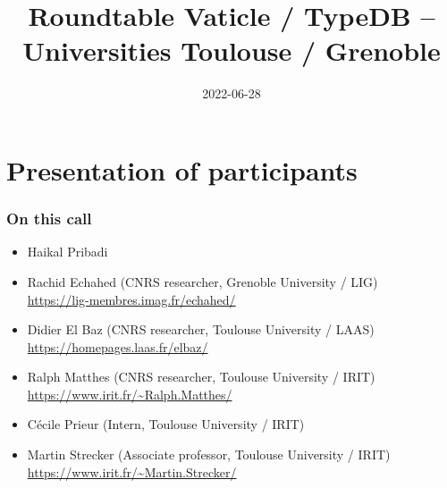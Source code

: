 \documentclass{beamer}
\title[Roundtable Vaticle / TypeDB  -- Toulouse / Grenoble]{Roundtable Vaticle / TypeDB -- Universities Toulouse / Grenoble}
\author{}
\date{2022-06-28}
\begin{document}

\begin{frame}
  \titlepage
\end{frame}



\section{Presentation of participants}

\begin{frame}[fragile]\frametitle{On this call}


  \begin{itemize}
  \item Haikal Pribadi
  \end{itemize}

  \vspace{3mm}


  \begin{itemize}
  \item Rachid Echahed (CNRS researcher, Grenoble University / LIG)\\
    \url{https://lig-membres.imag.fr/echahed/}
  \item Didier El Baz (CNRS researcher, Toulouse University / LAAS)\\
    \url{https://homepages.laas.fr/elbaz/}
  \item Ralph Matthes (CNRS researcher, Toulouse University / IRIT)\\
    \url{https://www.irit.fr/~Ralph.Matthes/}
  \item Cécile Prieur (Intern, Toulouse University / IRIT)
  \item Martin Strecker (Associate professor, Toulouse University / IRIT)\\
    \url{https://www.irit.fr/~Martin.Strecker/}
  \end{itemize}

\end{frame}
\end{document}
